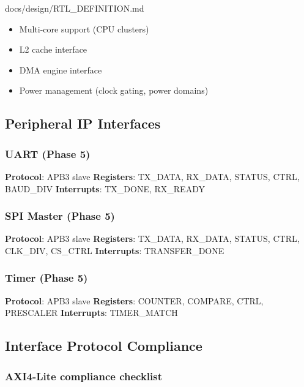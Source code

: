 \begin{relocated}{docs/design/RTL_DEFINITION.md}
\begin{itemize}
\tightlist
\item
  Multi-core support (CPU clusters)
\item
  L2 cache interface
\item
  DMA engine interface
\item
  Power management (clock gating, power domains)
\end{itemize}

\subsection{Peripheral IP Interfaces}\label{ds:ch:rtl-definition:peripheral-ip-interfaces}

\subsubsection{UART (Phase 5)}\label{ds:ch:rtl-definition:uart-phase-5}

\textbf{Protocol}: APB3 slave \textbf{Registers}: TX\_DATA, RX\_DATA,
STATUS, CTRL, BAUD\_DIV \textbf{Interrupts}: TX\_DONE, RX\_READY

\subsubsection{SPI Master (Phase 5)}\label{ds:ch:rtl-definition:spi-master-phase-5}

\textbf{Protocol}: APB3 slave \textbf{Registers}: TX\_DATA, RX\_DATA,
STATUS, CTRL, CLK\_DIV, CS\_CTRL \textbf{Interrupts}:
TRANSFER\_\allowbreak{}DONE

\subsubsection{Timer (Phase 5)}\label{ds:ch:rtl-definition:timer-phase-5}

\textbf{Protocol}: APB3 slave \textbf{Registers}: COUNTER, COMPARE,
CTRL, PRESCALER \textbf{Interrupts}: TIMER\_\allowbreak{}MATCH

\subsection{Interface Protocol Compliance}\label{ds:ch:rtl-definition:interface-protocol-compliance}

\subsubsection{AXI4-Lite compliance checklist}\label{ds:ch:rtl-definition:axi4-lite-compliance-checklist}


\end{relocated}
